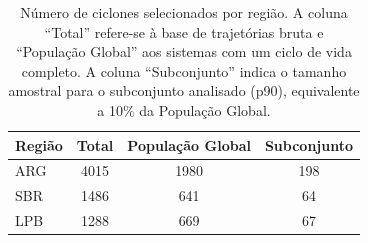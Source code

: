 \begin{table}[htbp]
\centering
\caption[Número de ciclones selecionados por região]{Número de ciclones selecionados por região. A coluna ``Total'' refere-se à base de trajetórias bruta e ``População Global'' aos sistemas com um ciclo de vida completo. A coluna ``Subconjunto'' indica o tamanho amostral para o subconjunto analisado (p90), equivalente a 10\% da População Global.}
\label{tab:conteo_ciclones}
\begin{tabular*}{\textwidth}{@{\extracolsep{\fill}}lccc}
\hline
Região & Total & População Global & Subconjunto \\
\hline
ARG & 4015 & 1980 & 198 \\
SBR & 1486 & 641  & 64  \\
LPB & 1288 & 669  & 67  \\
\hline
\end{tabular*}
\end{table}

